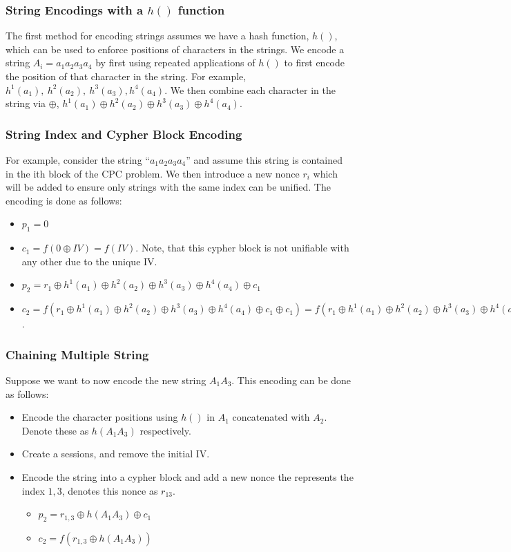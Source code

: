 \documentclass[11pt,twoside,a4paper]{article}
\begin{document}
\subsubsection{String Encodings with a $h()$ function}
The first method for encoding strings assumes we have a
hash function, $h()$, which can be used to enforce 
positions of characters in the strings. 
We encode a string $A_i = a_1 a_2 a_3 a_4$ by 
first using repeated applications of $h()$ to first encode
the position of that character in the string. For example,
$h^1(a_1), ~h^2(a_2), ~h^3(a_3), h^4(a_4)$.
We then combine each character in the string via $\oplus$,
$h^1(a_1) \oplus h^2(a_2) \oplus h^3(a_3) \oplus h^4(a_4)$. 


\subsubsection{String Index and Cypher Block Encoding}

For example, consider the string ``$a_1a_2a_3a_4$'' and assume
this string is contained in the ith block of the CPC problem.
We then introduce a new nonce $r_i$ which will be added to ensure
only strings with the same index can be unified. 
The encoding is done as follows:
\begin{itemize}
	\item $p_1 = 0$
	\item $c_1 = f(0 \oplus IV) = f(IV)$. 
	Note, that this cypher block is 
	not unifiable with any other due to the unique IV.
	\item $p_2 = r_1 \oplus h^1(a_1) \oplus h^2(a_2) \oplus h^3(a_3) \oplus h^4(a_4) \oplus c_1$
	\item $c_2 = f(r_1 \oplus h^1(a_1) \oplus h^2(a_2) \oplus h^3(a_3) \oplus h^4(a_4) \oplus c_1 \oplus c_1) = 
	f(r_1 \oplus h^1(a_1) \oplus h^2(a_2) \oplus h^3(a_3) \oplus h^4(a_4))$. 
\end{itemize} 


\subsubsection{Chaining Multiple String}
Suppose we want to now encode the new string $A_1 A_3$.
This encoding can be done as follows:
\begin{itemize}
	\item Encode the character positions using $h()$ in
	$A_1$ concatenated with $A_2$. 
	Denote these as $h(A_1A_3)$
	respectively. 
	\item Create a sessions, and remove the initial IV.
	\item Encode the string into a cypher block and add 
	a new nonce the represents the index $1,3$, denotes this
	nonce as $r_{13}$.
	\begin{itemize}
		\item $p_2= r_{1,3} \oplus h(A_1 A_3) \oplus c_1$
		\item $c_2 = f(r_{1,3} \oplus h(A_1 A_3))$
	\end{itemize} 
\end{itemize}
\end{document}
